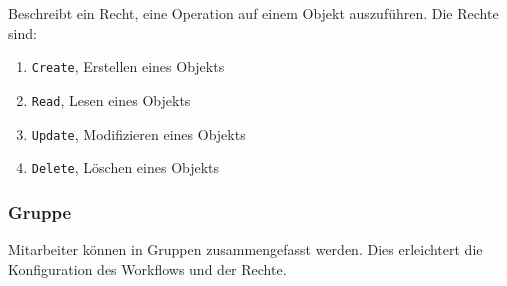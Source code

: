 Beschreibt ein Recht, eine Operation auf einem Objekt auszuführen. Die Rechte sind:

\begin{enumerate}\itemsep -5pt
\item \texttt{Create}, Erstellen eines Objekts
\item \texttt{Read}, Lesen eines Objekts
\item \texttt{Update}, Modifizieren eines Objekts
\item \texttt{Delete}, Löschen eines Objekts
\end{enumerate}

\subsubsection{Gruppe}\label{model:gruppe}

Mitarbeiter können in Gruppen zusammengefasst werden. Dies erleichtert die Konfiguration des Workflows und der Rechte.